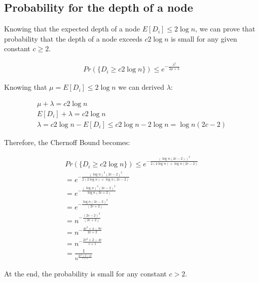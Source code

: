 \documentclass{article}
\begin{document}
\subsection{Probability for the depth of a node}

\noindent Knowing that the expected depth of a node $E[D_i] \le 2 \log n$, we can prove that probability that the depth
of a node exceeds $c 2 \log n$ is small for any given constant $c \ge 2$.

\begin{align}
    \textit{Pr}(\{D_i \ge c 2 \log n\}) \le e^{-\frac{\lambda^2}{2 \mu + \lambda}}
\end{align}

Knowing that $\mu = E[D_i] \le 2 \log n$ we can derived $\lambda$:

\begin{align*}
    \mu + \lambda = c 2 \log n \\
    E[D_i] + \lambda = c 2 \log n \\
    \lambda = c 2 \log n - E[D_i] \le c2 \log n - 2 \log n = \log n(2c - 2)
\end{align*}

Therefore, the Chernoff Bound becomes:

\begin{align*}
    \textit{Pr}(\{D_i \ge c 2 \log n\}) \le e^{-\frac{(\log n(2c - 2))^2}{2(2 \log n) + \log n(2c - 2)}} \\
    = e^{-\frac{(\log n)^2 (2c-2)^2}{2(2 \log n) + \log n (2c - 2)}} \\
    = e^{-\frac{(\log n)^2 (2c-2)^2}{\log n (2c + 2)}} \\
    = e^{-\frac{\log n (2c-2)^2}{(2c + 2)}} \\
    = n^{-\frac{(2c-2)^2}{(2c + 2)}} \\
    = n^{-\frac{4c^2 + 4 - 8c}{2c + 2}} \\
    = n^{-\frac{2c^2 + 2 - 4c}{c + 1}} \\
    = \frac{1}{n^{\frac{2c^2 + 2 - 4c}{c + 1}}}
\end{align*}

At the end, the probability is small for any constant $c > 2$.
\end{document}
